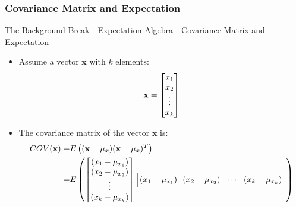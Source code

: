 \subsubsection{Covariance Matrix and Expectation}
\begin{frame}{The Background Break - Expectation Algebra - Covariance Matrix and Expectation}
\begin{itemize}
    \item Assume a vector $\mathbf{x}$ with $k$ elements:
        \begin{equation*}
            \centering
            \mathbf{x}=\begin{bmatrix}
            x_1\\
            x_2\\
            \vdots\\
            x_k\\
            \end{bmatrix}
            \end{equation*}
    \item The covariance matrix of the vector $\mathbf{x}$ is:
            \begin{align*}
            \centering
            COV(\mathbf{x}) = & E\left((\mathbf{x} -\mathbf{\mu}_x)(\mathbf{x} -\mathbf{\mu}_x)^T\right)\\
            = & E\left(\begin{bmatrix}
            (x_1-\mu_{x_1})\\
            (x_2-\mu_{x_2})\\
            \vdots\\
            (x_k-\mu_{x_k})\\
            \end{bmatrix}
            \Big[(x_1-\mu_{x_1})~~(x_2-\mu_{x_2})~~\cdots~~ (x_k-\mu_{x_k})\Big]
            \right)
            \end{align*}
\end{itemize}
\end{frame}



